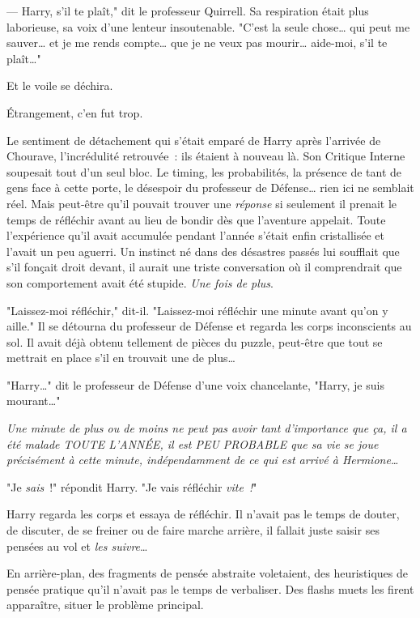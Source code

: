 --- Harry, s'il te plaît," dit le professeur Quirrell. Sa respiration était plus laborieuse, sa voix d'une lenteur insoutenable. "C'est la seule chose… qui peut me sauver… et je me rends compte… que je ne veux pas mourir… aide-moi, s'il te plaît…"

Et le voile se déchira.

Étrangement, c'en fut trop.

Le sentiment de détachement qui s'était emparé de Harry après l'arrivée de Chourave, l'incrédulité retrouvée~: ils étaient à nouveau là. Son Critique Interne soupesait tout d'un seul bloc. Le timing, les probabilités, la présence de tant de gens face à cette porte, le désespoir du professeur de Défense… rien ici ne semblait réel. Mais peut-être qu'il pouvait trouver une \emph{réponse} si seulement il prenait le temps de réfléchir avant au lieu de bondir dès que l'aventure appelait. Toute l'expérience qu'il avait accumulée pendant l'année s'était enfin cristallisée et l'avait un peu aguerri. Un instinct né dans des désastres passés lui soufflait que s'il fonçait droit devant, il aurait une triste conversation où il comprendrait que son comportement avait été stupide. \emph{Une fois de plus}.

"Laissez-moi réfléchir," dit-il. "Laissez-moi réfléchir une minute avant qu'on y aille." Il se détourna du professeur de Défense et regarda les corps inconscients au sol. Il avait déjà obtenu tellement de pièces du puzzle, peut-être que tout se mettrait en place s'il en trouvait une de plus…

"Harry…" dit le professeur de Défense d'une voix chancelante, "Harry, je suis mourant…"

\emph{Une minute de plus ou de moins ne peut pas avoir tant d'importance que ça, il a été malade TOUTE L'ANNÉE, il est PEU PROBABLE que sa vie se joue précisément à cette minute, indépendamment de ce qui est arrivé à Hermione…}

"Je \emph{sais}~!" répondit Harry. "Je vais réfléchir \emph{vite~!}"

Harry regarda les corps et essaya de réfléchir. Il n'avait pas le temps de douter, de discuter, de se freiner ou de faire marche arrière, il fallait juste saisir ses pensées au vol et \emph{les suivre}…

En arrière-plan, des fragments de pensée abstraite voletaient, des heuristiques de pensée pratique qu'il n'avait pas le temps de verbaliser. Des flashs muets les firent apparaître, situer le problème principal.

